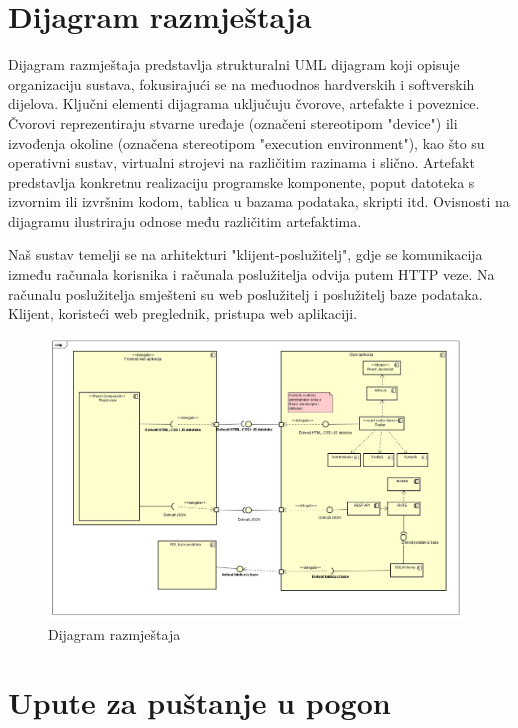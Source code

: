 			 	
			 	
			\eject 
		
		
		\section{Dijagram razmještaja}
			

			
			 \textit{}Dijagram razmještaja predstavlja strukturalni UML dijagram koji opisuje organizaciju sustava, fokusirajući se na međuodnos hardverskih i softverskih dijelova. Ključni elementi dijagrama uključuju čvorove, artefakte i poveznice. Čvorovi reprezentiraju stvarne uređaje (označeni stereotipom "device") ili izvođenja okoline (označena stereotipom "execution environment"), kao što su operativni sustav, virtualni strojevi na različitim razinama i slično. Artefakt predstavlja konkretnu realizaciju programske komponente, poput datoteka s izvornim ili izvršnim kodom, tablica u bazama podataka, skripti itd. Ovisnosti na dijagramu ilustriraju odnose među različitim artefaktima.
			 
			 Naš sustav temelji se na arhitekturi "klijent-poslužitelj", gdje se komunikacija između računala korisnika i računala poslužitelja odvija putem HTTP veze. Na računalu poslužitelja smješteni su web poslužitelj i poslužitelj baze podataka. Klijent, koristeći web preglednik, pristupa web aplikaciji.
			 
			 \begin{figure}[htb]
			 	\centering
			 	\includegraphics[width=11cm]{slike/Dijagram_komponensti.jpg}
			 	\caption{Dijagram razmještaja}
			 	\label{fig:fer-logo}
			 \end{figure}
			
			\eject 
		
		\section{Upute za puštanje u pogon}
		
